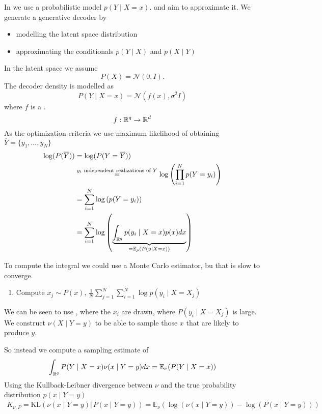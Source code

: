 In  we use a probabilistic model $p(Y\mid X=x)$. 
and aim to approximate it. We generate a generative decoder by \begin{itemize}
    \item  modelling the latent space distribution
    \item approximating the conditionals $p(Y\mid X)$ and $p(X\mid Y)$
\end{itemize}

In the latent space we assume 
\[P(X)=\mathcal{N}(0,I).\]
The decoder density is modelled as 
\[P(Y\mid X=x)=\mathcal{N}(f(x),\sigma^2I)\]
where $f$ is a .
\[f:\mathbb{R}^q\to\mathbb{R}^d\]
As the optimization criteria we use maximum likelihood of obtaining $\overline{Y}=\{y_1,\dots,y_N\}$
\begin{align*}
    \log(P(\overline{Y}))&=\log(P(Y=\overline{Y}))\\
    &\stackrel{\text{$y_i$ independent realizations of $Y$}}{=}\log\left(\prod_{i=1}^N p(Y=y_i)\right)\\
    &=\sum_{i=1}^N\log\left(p(Y=y_i)\right)\\
    &=\sum_{i=1}^N\log\left(\underbrace{\int_{\mathbb{R}^q} p(y_i\mid X=x)p(x)dx}_{=\mathbb{E}_p\left(P(y\mid X=x)\right)}\right)
\end{align*}

To compute the integral we could use a Monte Carlo estimator, bu that is slow to converge.

\begin{enumerate}
    \item Compute $x_j\sim P(x)$, $\frac{1}{N}\sum_{j=1}^N\sum_{i=1}^N \log p(y_i\mid X=X_j)$
\end{enumerate}

We can be seen to use , where the $x_i$ are drawn, where $P(y_i\mid X=X_j)$ is large.
We construct $\nu(X\mid Y=y)$ to be able to sample those $x$ that are likely to produce $y$.

So instead we compute a sampling estimate of 
\[\int_{\mathbb{R}^q}P(Y\mid X=x)\nu(x\mid Y=y)dx=\mathbb{E}_\nu(P(Y\mid X=x))\]
Using the Kullback-Leibner divergence between $\nu$ and the true probability distribution $p(x\mid Y=y)$
\begin{align*}
    K_{\nu,P}=\text{KL}(\nu(x\mid Y=y)\Vert P(x\mid Y=y))=\mathbb{E}_\nu\left(\log(\nu(x\mid Y=y))-\log(P(x\mid Y=y))\right)
\end{align*}

